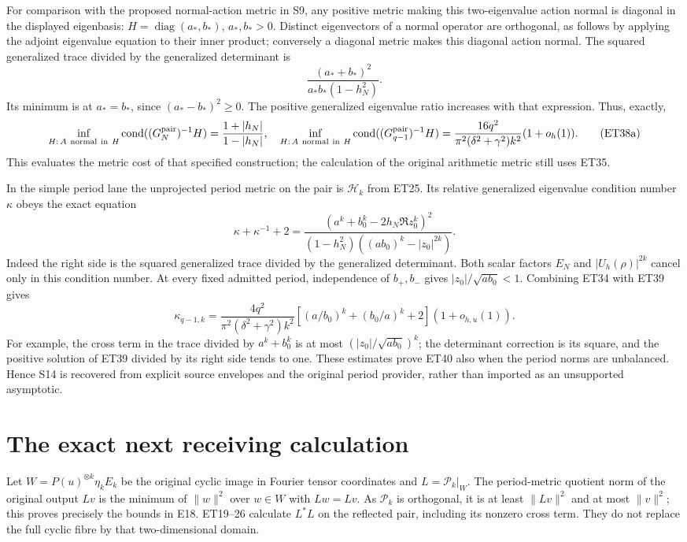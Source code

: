 \documentclass[11pt]{article}
\DeclareMathOperator{\cond}{cond}
\begin{document}
For comparison with the proposed normal-action metric in S9, any
positive metric making this two-eigenvalue action normal is diagonal
in the displayed eigenbasis: \(H=\operatorname{diag}(a_*,b_*)\),
\(a_*,b_*>0\). Distinct eigenvectors of a normal operator are
orthogonal, as follows by applying the adjoint eigenvalue equation
to their inner product; conversely a diagonal metric makes this
diagonal action normal. The squared generalized trace divided by
the generalized determinant is
\[
 \frac{(a_*+b_*)^2}{a_*b_*(1-h_N^2)}.
\]
Its minimum is at \(a_*=b_*\), since
\((a_*-b_*)^2\ge0\). The positive generalized eigenvalue ratio
increases with that expression. Thus, exactly,
\[
 \inf_{H:\,A\ {\rm normal\ in}\ H}
 \cond((G_N^{\rm pair})^{-1}H)
 =\frac{1+|h_N|}{1-|h_N|},
 \quad
 \inf_{H:\,A\ {\rm normal\ in}\ H}
 \cond((G_{q-1}^{\rm pair})^{-1}H)
 =\frac{16q^2}{\pi^2(\delta^2+\gamma^2)k^2}
                      (1+o_h(1)).                    \tag{ET38a}
\]
This evaluates the metric cost of that specified construction; the
calculation of the original arithmetic metric still uses ET35.

In the simple period lane the unprojected period metric on the pair
is \(\mathcal H_k\) from ET25. Its relative generalized eigenvalue
condition number \(\kappa\) obeys the exact equation
\[
 \kappa+\kappa^{-1}+2=
 \frac{(a^k+b_0^k-2h_N\Re z_0^k)^2}
 {(1-h_N^2)((ab_0)^k-|z_0|^{2k})}.                  \tag{ET39}
\]
Indeed the right side is the squared generalized trace divided by
the generalized determinant. Both scalar factors
\(E_N\) and \(|U_h(\rho)|^{2k}\) cancel only in this condition number.
At every fixed admitted period, independence of \(b_+,b_-\) gives
\(|z_0|/\sqrt{ab_0}<1\). Combining ET34 with ET39 gives
\[
 \kappa_{q-1,k}=
 \frac{4q^2}{\pi^2(\delta^2+\gamma^2)k^2}
 \left[(a/b_0)^k+(b_0/a)^k+2\right](1+o_{h,u}(1)).
                                                               \tag{ET40}
\]
For example, the cross term in the trace divided by
\(a^k+b_0^k\) is at most
\((|z_0|/\sqrt{ab_0})^k\); the determinant correction is its
square, and the positive solution of ET39 divided by its right
side tends to one. These estimates prove ET40 also when the period
norms are unbalanced. Hence S14 is recovered from explicit source
envelopes and the original period provider, rather than imported
as an unsupported asymptotic.

\section{The exact next receiving calculation}
Let \(W=P(u)^{\otimes k}\eta_kE_k\) be the original cyclic image
in Fourier tensor coordinates and \(L=\mathcal P_k|_W\).
The period-metric quotient norm of the original output \(Lv\) is
the minimum of \(\|w\|^2\) over \(w\in W\) with \(Lw=Lv\).
As \(\mathcal P_k\) is orthogonal, it is at least \(\|Lv\|^2\)
and at most \(\|v\|^2\); this proves precisely the bounds in E18.
ET19--26 calculate \(L^*L\) on the reflected pair, including its
nonzero cross term. They do not replace the full cyclic fibre by
that two-dimensional domain.
\end{document}
